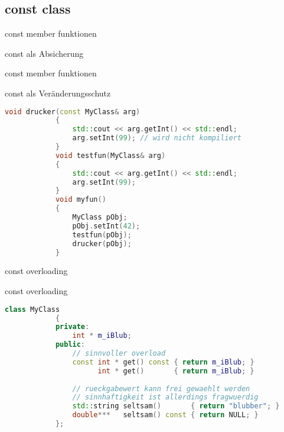 
\subsection{const class}

\begin{frame}[fragile]{const member funktionen}

	\begin{block}{const als Absicherung}
		
	\end{block}
	
\end{frame}


\begin{frame}[fragile]{const member funktionen}

	\begin{block}{const als Veränderungsschutz}
	\begin{small}
		\begin{lstlisting}[language=C++]
			void drucker(const MyClass& arg)
			{
			    std::cout << arg.getInt() << std::endl;
			    arg.setInt(99); // wird nicht kompiliert
			}
			void testfun(MyClass& arg)
			{
			    std::cout << arg.getInt() << std::endl;
			    arg.setInt(99);
			}
			void myfun()
			{
			    MyClass pObj;
			    pObj.setInt(42);
			    testfun(pObj);
			    drucker(pObj);
			}
		\end{lstlisting}
		\end{small}
	\end{block}
	
\end{frame}


\begin{frame}[fragile]{const overloading}

	\begin{block}{const overloading}
	\begin{small}
		\begin{lstlisting}[language=C++]
			class MyClass
			{
			private:
			    int * m_iBlub;
			public:
			    // sinnvoller overload
			    const int * get() const { return m_iBlub; }
			          int * get()       { return m_iBlub; }
			    
			    // rueckgabewert kann frei gewaehlt werden
			    // sinnhaftigkeit ist allerdings fragwuerdig
			    std::string seltsam()       { return "blubber"; }
			    double***   seltsam() const { return NULL; }
			};
		\end{lstlisting}
		\end{small}
	\end{block}

\end{frame}